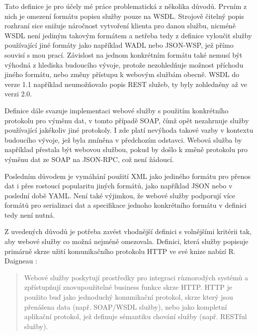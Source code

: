 \documentclass[czech,DP]{thesiskiv}
\begin{document}

Tato definice je pro účely mé práce problematická z několika důvodů. Prvním z nich je omezení formátu popisu služby pouze na WSDL. Strojově čitelný popis rozhraní sice snižuje náročnost vytvoření klienta pro danou službu, nicméně WSDL není jediným takovým formátem a netřeba tedy z definice vyloučit služby používající jiné formáty jako například WADL nebo JSON-WSP, jež přímo souvisí s mou prací. Závislost na jednom konkrétním formátu také nemusí být výhodná z hlediska budoucího vývoje, protože nezohledňuje možnost příchodu jiného formátu, nebo změny přístupu k webovým službám obecně. WSDL do verze 1.1 například neumožňovalo popis REST služeb, ty byly zohledněny až ve verzi 2.0\cite{restWsdl}.  

Definice dále svazuje implementaci webové služby s použitím konkrétního protokolu pro výměnu dat, v tomto případě SOAP, čímž opět nezahrnuje služby používající jakékoliv jiné protokoly. I zde platí nevýhoda takové vazby v kontextu budoucího vývoje, jež byla zmíněna v předchozím odstavci. Webová služba by například přestala být webovou službou, pokud by došlo k změně protokolu pro výměnu dat ze SOAP na JSON-RPC, což není žádoucí.

Posledním důvodem je vymáhání použití XML jako jediného formátu pro přenos dat i přes rostoucí popularitu jiných formátů, jako například JSON nebo v poslední době YAML. Není také výjimkou, že webové služby podporují více formátů pro serializaci dat a specifikace jednoho konkrétního formátu v definici tedy není nutná. 

Z uvedených důvodů je potřeba zavést vhodnější definici s volnějšími kritérii tak, aby webové služby co možná nejméně omezovala. Definici, která služby popisuje primárně skrze užití komunikačního protokolu HTTP ve své knize nabízí R. Daigneau \cite{fromObjectsToWs}: 

\begin{quote}
	Webové služby poskytují prostředky pro integraci různorodých systémů a zpřístupňují znovupoužitelné business funkce skrze HTTP. HTTP je použito buď jako jednoduchý komunikační protokol, skrze který jsou přenášena data (např. SOAP/WSDL služby), nebo jako kompletní aplikační protokol, jež definuje sémantiku chování služby (např. RESTful služby).
\end{quote}
\end{document}

